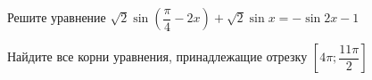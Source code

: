 \begin{ex}
	\begin{condition}
		\begin{enumcols}[label=\asbuk*)]
			\item Решите уравнение \( \sqrt{2}\sin{\left(\dfrac{\pi}{4}-2x\right)} + \sqrt{2}\sin x = -\sin 2x - 1 \)
			\item Найдите все корни уравнения, принадлежащие отрезку \( \left[4\pi;\dfrac{11\pi}{2}\right]  \)
		\end{enumcols}
	\end{condition}
\end{ex}